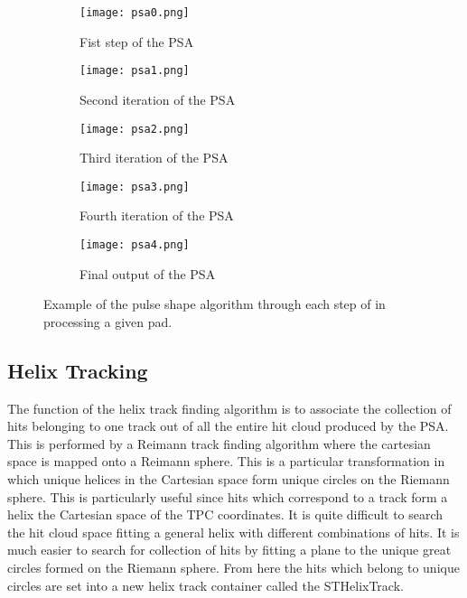 \begin{figure}[!htb]
     \centering
     \begin{subfigure}[b]{0.24\textwidth}
         \centering
         \texttt{[image: psa0.png]}
         \caption{Fist step of the PSA}
         \label{fig:psa0}
     \end{subfigure}
     \hfill
     \centering
     \begin{subfigure}[b]{0.24\textwidth}
         \centering
         \texttt{[image: psa1.png]}
         \caption{Second iteration of the PSA}
         \label{fig:psa1}
     \end{subfigure}
     \hfill
      \centering
     \begin{subfigure}[b]{0.24\textwidth}
         \centering
         \texttt{[image: psa2.png]}
         \caption{Third iteration of the PSA}
         \label{fig:psa2}
     \end{subfigure}
     \hfill
      \centering
     \begin{subfigure}[b]{0.24\textwidth}
         \centering
         \texttt{[image: psa3.png]}
         \caption{Fourth iteration of the PSA}
         \label{fig:psa3}
     \end{subfigure}
     \hfill
     \centering
     \begin{subfigure}[b]{.5\textwidth}
         \centering
         \texttt{[image: psa4.png]}
         \caption{Final output of the PSA}
         \label{fig:psa4}
     \end{subfigure}
     \hfill
    
\caption{Example of the pulse shape algorithm through each step of in processing a given pad. }
\label{fig:psaTask}
\end{figure}


\subsection{Helix Tracking}

 The function of the  helix track finding algorithm is to associate the collection of hits belonging to one track out of all the entire hit cloud produced by the PSA. This is performed by a Reimann track finding algorithm where the cartesian space is mapped onto a Reimann sphere. This is a particular transformation in which unique helices in the Cartesian space form unique circles on the Riemann sphere. This is particularly useful since hits which correspond to a track form a helix the Cartesian space of the TPC coordinates. It is quite difficult to search the hit cloud space fitting a general helix with different combinations of hits. It is much easier to search for collection of hits by fitting a plane to the unique great circles formed on the Riemann sphere. From here the hits which belong to unique circles are set into a new helix track container called the STHelixTrack. 
 

